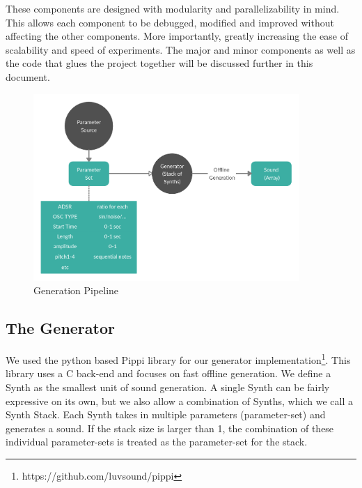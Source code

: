 \documentclass{nime-alternate} %
\begin{document}
These components are designed with modularity and parallelizability in mind. This allows each component to be debugged, modified and improved without affecting the other components. More importantly, greatly increasing the ease of scalability and speed of experiments.
The major and minor components as well as the code that glues the project together will be discussed further in this document. 
\begin{figure}[H]
\centering
\includegraphics[width=0.9\textwidth]{images/SSS_gen.png}
\caption{Generation Pipeline}
\label{fig:SSS generator}
\end{figure}

\subsection{The Generator}
We used the python based Pippi library for our generator implementation\footnote{https://github.com/luvsound/pippi}. This library uses a C back-end and focuses on fast offline generation. We define a Synth as the smallest unit of sound generation. A single Synth can be fairly expressive on its own, but we also allow a combination of Synths, which we call a Synth Stack. Each Synth takes in multiple parameters (parameter-set) and generates a sound. If the stack size is larger than 1, the combination of these individual parameter-sets is treated as the parameter-set for the stack. 
\end{document}
